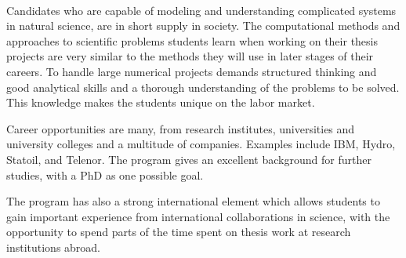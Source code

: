 \documentclass[%
oneside,                 %
final,                   %
10pt]{article}
\begin{document}
\paragraph{}
Candidates who are capable of modeling and understanding complicated
systems in natural science, are in short supply in society.  The
computational methods and approaches to scientific problems students learn
when working on their thesis projects are very similar to the methods
they will use in later stages of their careers.  To handle large
numerical projects demands structured thinking and good analytical
skills and a thorough understanding of the problems to be solved. This
knowledge makes the students unique on the labor market.

Career opportunities are many, from research institutes, universities
and university colleges and a multitude of companies. Examples
include IBM, Hydro, Statoil, and Telenor.  The program gives an
excellent background for further studies, with a PhD as one possible
goal.

The program has also a strong international element which allows students to
gain important experience from international collaborations in
science, with the opportunity to spend parts of the time spent on
thesis work at research institutions abroad.




\end{document}
